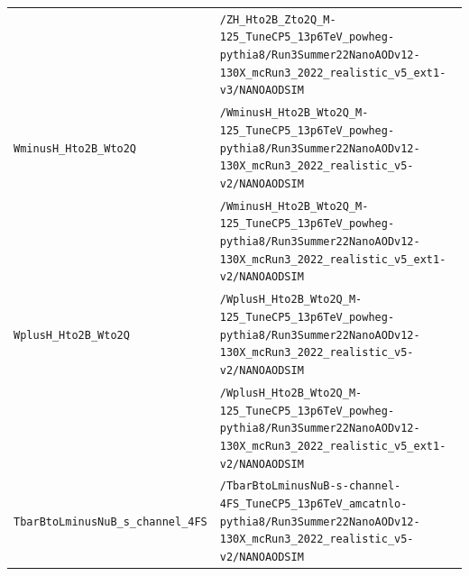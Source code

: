 \begin{longtable}{@{}>{\RaggedRight\arraybackslash}p{} >{\RaggedRight\arraybackslash}p{}@{}}
 & \texttt{/\allowbreak{}ZH\_\allowbreak{}Hto2B\_\allowbreak{}Zto2Q\_\allowbreak{}M-\allowbreak{}125\_\allowbreak{}TuneCP5\_\allowbreak{}13p6TeV\_\allowbreak{}powheg-\allowbreak{}pythia8/\allowbreak{}Run3Summer22NanoAODv12-\allowbreak{}130X\_\allowbreak{}mcRun3\_\allowbreak{}2022\_\allowbreak{}realistic\_\allowbreak{}v5\_\allowbreak{}ext1-\allowbreak{}v3/\allowbreak{}NANOAODSIM} \\
\addlinespace[2pt]
\texttt{WminusH\_\allowbreak{}Hto2B\_\allowbreak{}Wto2Q} & \texttt{/\allowbreak{}WminusH\_\allowbreak{}Hto2B\_\allowbreak{}Wto2Q\_\allowbreak{}M-\allowbreak{}125\_\allowbreak{}TuneCP5\_\allowbreak{}13p6TeV\_\allowbreak{}powheg-\allowbreak{}pythia8/\allowbreak{}Run3Summer22NanoAODv12-\allowbreak{}130X\_\allowbreak{}mcRun3\_\allowbreak{}2022\_\allowbreak{}realistic\_\allowbreak{}v5-\allowbreak{}v2/\allowbreak{}NANOAODSIM} \\
 & \texttt{/\allowbreak{}WminusH\_\allowbreak{}Hto2B\_\allowbreak{}Wto2Q\_\allowbreak{}M-\allowbreak{}125\_\allowbreak{}TuneCP5\_\allowbreak{}13p6TeV\_\allowbreak{}powheg-\allowbreak{}pythia8/\allowbreak{}Run3Summer22NanoAODv12-\allowbreak{}130X\_\allowbreak{}mcRun3\_\allowbreak{}2022\_\allowbreak{}realistic\_\allowbreak{}v5\_\allowbreak{}ext1-\allowbreak{}v2/\allowbreak{}NANOAODSIM} \\
\addlinespace[2pt]
\texttt{WplusH\_\allowbreak{}Hto2B\_\allowbreak{}Wto2Q} & \texttt{/\allowbreak{}WplusH\_\allowbreak{}Hto2B\_\allowbreak{}Wto2Q\_\allowbreak{}M-\allowbreak{}125\_\allowbreak{}TuneCP5\_\allowbreak{}13p6TeV\_\allowbreak{}powheg-\allowbreak{}pythia8/\allowbreak{}Run3Summer22NanoAODv12-\allowbreak{}130X\_\allowbreak{}mcRun3\_\allowbreak{}2022\_\allowbreak{}realistic\_\allowbreak{}v5-\allowbreak{}v2/\allowbreak{}NANOAODSIM} \\
 & \texttt{/\allowbreak{}WplusH\_\allowbreak{}Hto2B\_\allowbreak{}Wto2Q\_\allowbreak{}M-\allowbreak{}125\_\allowbreak{}TuneCP5\_\allowbreak{}13p6TeV\_\allowbreak{}powheg-\allowbreak{}pythia8/\allowbreak{}Run3Summer22NanoAODv12-\allowbreak{}130X\_\allowbreak{}mcRun3\_\allowbreak{}2022\_\allowbreak{}realistic\_\allowbreak{}v5\_\allowbreak{}ext1-\allowbreak{}v2/\allowbreak{}NANOAODSIM} \\
\addlinespace[2pt]
\texttt{TbarBtoLminusNuB\_\allowbreak{}s\_\allowbreak{}channel\_\allowbreak{}4FS} & \texttt{/\allowbreak{}TbarBtoLminusNuB-\allowbreak{}s-\allowbreak{}channel-\allowbreak{}4FS\_\allowbreak{}TuneCP5\_\allowbreak{}13p6TeV\_\allowbreak{}amcatnlo-\allowbreak{}pythia8/\allowbreak{}Run3Summer22NanoAODv12-\allowbreak{}130X\_\allowbreak{}mcRun3\_\allowbreak{}2022\_\allowbreak{}realistic\_\allowbreak{}v5-\allowbreak{}v2/\allowbreak{}NANOAODSIM} \\

\end{longtable}
